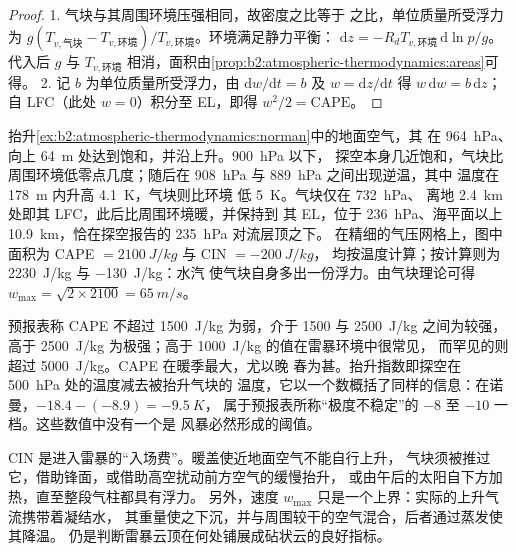\begin{proof}
1. 气块与其周围环境压强相同，故密度之比等于
之比，单位质量所受浮力为
$g(T_{v,\text{气块}} - T_{v,\text{环境}})/T_{v,\text{环境}}$。环境满足静力平衡：
$\mathrm{d}z = -R_dT_{v,\text{环境}}\,\mathrm{d}\ln p/g$。代入后 $g$ 与
$T_{v,\text{环境}}$ 相消，面积由\cref{prop:b2:atmospheric-thermodynamics:areas}可得。
2. 记 $b$ 为单位质量所受浮力，由 $\mathrm{d}w/\mathrm{d}t = b$ 及 $w = \mathrm{d}z/
\mathrm{d}t$ 得 $w\,\mathrm{d}w = b\,\mathrm{d}z$；自 LFC（此处 $w = 0$）积分至
EL，即得 $w^2/2 = \text{CAPE}$。
\end{proof}

\begin{example}[诺曼探空中的能量]\label{ex:b2:atmospheric-thermodynamics:cape}
抬升\cref{ex:b2:atmospheric-thermodynamics:norman}中的地面空气，其
在 \qty{964}{hPa}、向上 \qty{64}{m} 处达到饱和，并沿上升。\qty{900}{hPa} 以下，
探空本身几近饱和，气块比
周围环境低零点几度；随后在 \qty{908}{hPa} 与 \qty{889}{hPa} 之间出现逆温，其中
温度在 \qty{178}{m} 内升高 \qty{4.1}{K}，气块则比环境
低 \qty{5}{K}。气块仅在 \qty{732}{hPa}、
离地 \qty{2.4}{km} 处即其 LFC，此后比周围环境暖，并保持到
其 EL，位于 \qty{236}{hPa}、海平面以上 \qty{10.9}{km}，恰在探空报告的 \qty{235}{hPa} 对流层顶之下。
在精细的气压网格上，图中面积为 CAPE $= \qty{2100}{J/kg}$ 与 CIN $= \qty{-200}{J/kg}$，
均按温度计算；按计算则为 \qty{2230}{J/kg} 与 \qty{-130}{J/kg}：水汽
使气块自身多出一份浮力。由气块理论可得 $w_{\max} = \sqrt{2 \times 2100} =
\qty{65}{m/s}$。
\end{example}

预报表称 CAPE 不超过 \qty{1500}{J/kg} 为弱，介于 1500 与
\qty{2500}{J/kg} 之间为较强，高于 \qty{2500}{J/kg} 为极强；高于 \qty{1000}{J/kg} 的值在雷暴环境中很常见，
而罕见的则超过 \qty{5000}{J/kg}。CAPE 在暖季最大，尤以晚
春为甚。抬升指数即探空在 \qty{500}{hPa} 处的温度减去被抬升气块的
温度，它以一个数概括了同样的信息：在诺曼，$-18.4 - (-8.9) = \qty{-9.5}{K}$，
属于预报表所称“极度不稳定”的 $-8$ 至 $-10$ 一档。这些数值中没有一个是
风暴必然形成的阈值。

CIN 是进入雷暴的“入场费”。暖盖使近地面空气不能自行上升，
气块须被推过它，借助锋面，或借助高空扰动前方空气的缓慢抬升，
或由午后的太阳自下方加热，直至整段气柱都具有浮力。
另外，速度 $w_{\max}$ 只是一个上界：实际的上升气流携带着凝结水，
其重量使之下沉，并与周围较干的空气混合，后者通过蒸发使其降温。
仍是判断雷暴云顶在何处铺展成砧状云的良好指标。

